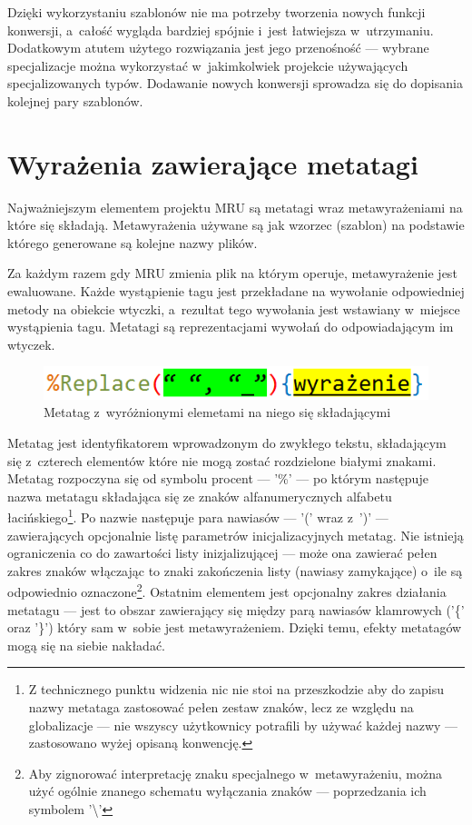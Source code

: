 \par
Dzięki wykorzystaniu szablonów nie ma potrzeby tworzenia nowych funkcji konwersji, a~całość wygląda bardziej spójnie i~jest łatwiejsza w~utrzymaniu. Dodatkowym atutem użytego rozwiązania jest jego przenośność --- wybrane specjalizacje można wykorzystać w~jakimkolwiek projekcie używających specjalizowanych typów. Dodawanie nowych konwersji sprowadza się do dopisania kolejnej pary szablonów.

\section{Wyrażenia zawierające metatagi}
Najważniejszym elementem projektu MRU są metatagi wraz metawyrażeniami na które się składają.
Metawyrażenia używane są jak wzorzec (szablon) na podstawie którego generowane są kolejne nazwy plików.

\par
Za każdym razem gdy MRU zmienia plik na którym operuje, metawyrażenie jest ewaluowane. Każde wystąpienie tagu jest przekładane na wywołanie odpowiedniej metody na obiekcie wtyczki, a~rezultat tego wywołania jest wstawiany w~miejsce wystąpienia tagu.
Metatagi są reprezentacjami wywołań do odpowiadającym im wtyczek.

\begin{figure}
\begin{center}
\includegraphics[scale=0.50]{img/metatag_sample.png}
\end{center}
\caption{Metatag z~wyróżnionymi elemetami na niego się składającymi}
\end{figure}

\par
Metatag jest identyfikatorem wprowadzonym do zwykłego tekstu, składającym się z~czterech elementów które nie mogą zostać rozdzielone białymi znakami. Metatag rozpoczyna się od symbolu procent --- '\%' --- po którym następuje nazwa metatagu składająca się ze znaków alfanumerycznych alfabetu łacińskiego\footnote{Z technicznego punktu widzenia nic nie stoi na przeszkodzie aby do zapisu nazwy metataga zastosować pełen zestaw znaków, lecz ze względu na globalizacje --- nie wszyscy użytkownicy potrafili by używać każdej nazwy --- zastosowano wyżej opisaną konwencję.}.
Po nazwie następuje para nawiasów --- '(' wraz z~')' --- zawierających opcjonalnie listę parametrów inicjalizacyjnych metatag. Nie istnieją ograniczenia co do zawartości listy inizjalizującej --- może ona zawierać pełen zakres znaków włączając to znaki zakończenia listy (nawiasy zamykające) o~ile są odpowiednio oznaczone\footnote{Aby zignorować interpretację znaku specjalnego w~metawyrażeniu, można użyć ogólnie znanego schematu wyłączania znaków --- poprzedzania ich symbolem '\textbackslash'}.
Ostatnim elementem jest opcjonalny zakres działania metatagu --- jest to obszar zawierający się między parą nawiasów klamrowych ('\{' oraz '\}') który sam w~sobie jest metawyrażeniem. Dzięki temu, efekty metatagów mogą się na siebie nakładać.

